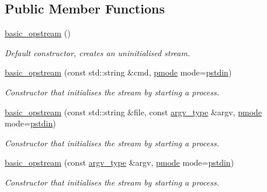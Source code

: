 \subsection*{Public Member Functions}
\begin{DoxyCompactItemize}
\item 
\mbox{\label{classredi_1_1basic__opstream_a43ed3a24aba89347e88a1bf30583cac1}} 
\mbox{\hyperlink{classredi_1_1basic__opstream_a43ed3a24aba89347e88a1bf30583cac1}{basic\+\_\+opstream}} ()
\begin{DoxyCompactList}\small\item\em Default constructor, creates an uninitialised stream. \end{DoxyCompactList}\item 
\mbox{\hyperlink{classredi_1_1basic__opstream_ac7d4fc3ce22a34257cb43b4f35969605}{basic\+\_\+opstream}} (const std\+::string \&cmd, \mbox{\hyperlink{structredi_1_1pstreams_a1eae4aad88812af03a0fbb3ec13c50b7}{pmode}} mode=\mbox{\hyperlink{structredi_1_1pstreams_a7a976ce992db857f86a0cc3352e42d3a}{pstdin}})
\begin{DoxyCompactList}\small\item\em Constructor that initialises the stream by starting a process. \end{DoxyCompactList}\item 
\mbox{\hyperlink{classredi_1_1basic__opstream_a23394be0be6f4f8f7f17981f456b552d}{basic\+\_\+opstream}} (const std\+::string \&file, const \mbox{\hyperlink{structredi_1_1pstreams_af902b894b095c1875e96c10129489467}{argv\+\_\+type}} \&argv, \mbox{\hyperlink{structredi_1_1pstreams_a1eae4aad88812af03a0fbb3ec13c50b7}{pmode}} mode=\mbox{\hyperlink{structredi_1_1pstreams_a7a976ce992db857f86a0cc3352e42d3a}{pstdin}})
\begin{DoxyCompactList}\small\item\em Constructor that initialises the stream by starting a process. \end{DoxyCompactList}\item 
\mbox{\hyperlink{classredi_1_1basic__opstream_a10095c2f36cf31f537934ad3d34aa8aa}{basic\+\_\+opstream}} (const \mbox{\hyperlink{structredi_1_1pstreams_af902b894b095c1875e96c10129489467}{argv\+\_\+type}} \&argv, \mbox{\hyperlink{structredi_1_1pstreams_a1eae4aad88812af03a0fbb3ec13c50b7}{pmode}} mode=\mbox{\hyperlink{structredi_1_1pstreams_a7a976ce992db857f86a0cc3352e42d3a}{pstdin}})
\begin{DoxyCompactList}\small\item\em Constructor that initialises the stream by starting a process. \end{DoxyCompactList}\item 

\end{DoxyCompactItemize}
